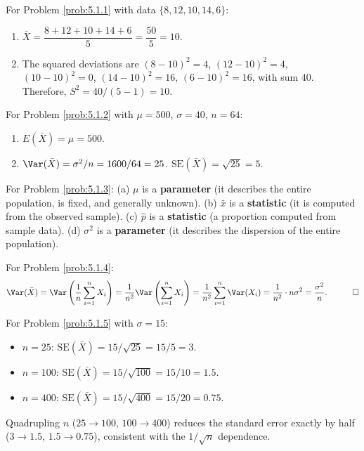 \begin{solucion}
	\label{sol:5.1.1}
	For Problem \ref{prob:5.1.1} with data $\{8, 12, 10, 14, 6\}$:
	\begin{enumerate}
		\item $\bar{X} = \dfrac{8+12+10+14+6}{5} = \dfrac{50}{5} = 10$.
		\item The squared deviations are $(8-10)^{2}=4$, $(12-10)^{2}=4$, $(10-10)^{2}=0$, $(14-10)^{2}=16$, $(6-10)^{2}=16$, with sum $40$. Therefore, $S^{2} = 40/(5-1) = 10$. \quad \qedhere
	\end{enumerate}
\end{solucion}

\begin{solucion}
	\label{sol:5.1.2}
	For Problem \ref{prob:5.1.2} with $\mu=500$, $\sigma=40$, $n=64$:
	\begin{enumerate}
		\item $E(\bar{X}) = \mu = 500$.
		\item $\Var(\bar{X}) = \sigma^{2}/n = 1600/64 = 25$. $\text{SE}(\bar{X}) = \sqrt{25} = 5$. \quad \qedhere
	\end{enumerate}
\end{solucion}

\begin{solucion}
	\label{sol:5.1.3}
	For Problem \ref{prob:5.1.3}: (a) $\mu$ is a \textbf{parameter} (it describes the entire population, is fixed, and generally unknown). (b) $\bar{x}$ is a \textbf{statistic} (it is computed from the observed sample). (c) $\hat{p}$ is a \textbf{statistic} (a proportion computed from sample data). (d) $\sigma^{2}$ is a \textbf{parameter} (it describes the dispersion of the entire population). \quad \qedhere
\end{solucion}

\begin{solucion}
	\label{sol:5.1.4}
	For Problem \ref{prob:5.1.4}:
	\begin{align*}
		\Var(\bar{X}) = \Var\left(\frac{1}{n}\sum_{i=1}^{n} X_i\right) = \frac{1}{n^{2}}\Var\left(\sum_{i=1}^{n} X_i\right)
		= \frac{1}{n^{2}}\sum_{i=1}^{n}\Var(X_i) = \frac{1}{n^{2}}\cdot n\sigma^{2} = \frac{\sigma^{2}}{n}. \quad \qedhere
	\end{align*}
\end{solucion}

\begin{solucion}
	\label{sol:5.1.5}
	For Problem \ref{prob:5.1.5} with $\sigma=15$:
	\begin{itemize}
		\item $n=25$: $\text{SE}(\bar{X}) = 15/\sqrt{25} = 15/5 = 3$.
		\item $n=100$: $\text{SE}(\bar{X}) = 15/\sqrt{100} = 15/10 = 1.5$.
		\item $n=400$: $\text{SE}(\bar{X}) = 15/\sqrt{400} = 15/20 = 0.75$.
	\end{itemize}
	Quadrupling $n$ ($25\to100$, $100\to400$) reduces the standard error exactly by half ($3\to1.5$, $1.5\to0.75$), consistent with the $1/\sqrt{n}$ dependence. \quad \qedhere
\end{solucion}

